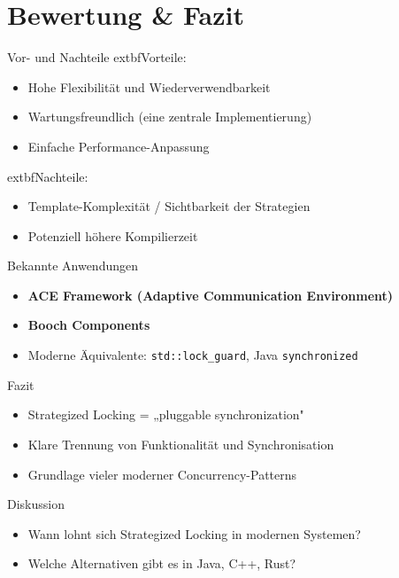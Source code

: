 \documentclass[aspectratio=169,10pt]{beamer}
\begin{document}
\section{Bewertung \& Fazit}
\begin{frame}{Vor- und Nachteile}
  	extbf{Vorteile:}
  \begin{itemize}
    \item Hohe Flexibilität und Wiederverwendbarkeit
    \item Wartungsfreundlich (eine zentrale Implementierung)
    \item Einfache Performance-Anpassung
  \end{itemize}

  \vspace{1em}
  	extbf{Nachteile:}
  \begin{itemize}
    \item Template-Komplexität / Sichtbarkeit der Strategien
    \item Potenziell höhere Kompilierzeit
  \end{itemize}
\end{frame}

\begin{frame}{Bekannte Anwendungen}
  \begin{itemize}
    \item \textbf{ACE Framework (Adaptive Communication Environment)}
    \item \textbf{Booch Components}
    \item Moderne Äquivalente: \texttt{std::lock\_guard}, Java \texttt{synchronized}
  \end{itemize}
\end{frame}

\begin{frame}{Fazit}
  \begin{itemize}
    \item Strategized Locking = „pluggable synchronization"
    \item Klare Trennung von Funktionalität und Synchronisation
    \item Grundlage vieler moderner Concurrency-Patterns
  \end{itemize}
\end{frame}

\begin{frame}{Diskussion}
  \begin{itemize}
    \item Wann lohnt sich Strategized Locking in modernen Systemen?
    \item Welche Alternativen gibt es in Java, C++, Rust?
  \end{itemize}
\end{frame}
\end{document}
